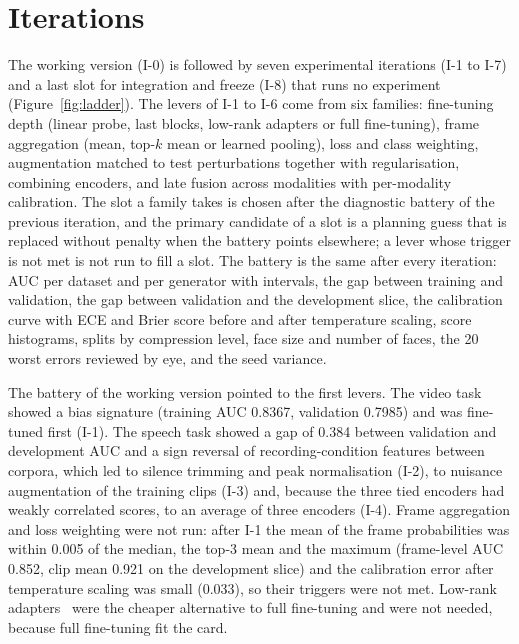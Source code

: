 \documentclass[conference,a4paper]{IEEEtran_nodash}
\begin{document}
\section{Iterations}\label{sec:iters}

The working version (I-0) is followed by seven experimental iterations (I-1 to
I-7) and a last slot for integration and freeze (I-8) that runs no experiment
(Figure~\ref{fig:ladder}). The levers of I-1 to I-6 come from six families:
fine-tuning depth (linear probe, last blocks, low-rank adapters or full
fine-tuning), frame aggregation (mean, top-$k$ mean or learned pooling), loss
and class weighting, augmentation matched to test perturbations together with
regularisation, combining encoders, and late fusion across modalities with
per-modality calibration. The slot a family takes is chosen after the
diagnostic battery of the previous iteration, and the primary candidate of a
slot is a planning guess that is replaced without penalty when the battery
points elsewhere; a lever whose trigger is not met is not run to fill a slot.
The battery is the same after every iteration: AUC per
dataset and per generator with intervals, the gap between training and
validation, the gap between validation and the development slice, the
calibration curve with ECE and Brier score before and after temperature
scaling, score histograms, splits by compression level, face size and number of
faces, the 20 worst errors reviewed by eye, and the seed variance.

The battery of the working version pointed to the first levers. The video task showed a bias signature (training AUC
0.8367, validation 0.7985) and was fine-tuned first (I-1). The speech task showed
a gap of 0.384 between validation and development AUC and a sign reversal of
recording-condition features between corpora, which led to silence trimming and
peak normalisation (I-2), to nuisance augmentation of the training clips (I-3)
and, because the three tied encoders had weakly correlated scores, to an average
of three encoders (I-4). Frame aggregation and loss weighting were not run:
after I-1 the mean of the frame probabilities was within 0.005 of the median,
the top-3 mean and the maximum (frame-level AUC 0.852, clip mean 0.921 on the
development slice)
and the calibration error after temperature scaling was small (0.033), so
their triggers were not met. Low-rank adapters~\cite{hu2022lora} were the
cheaper alternative to full fine-tuning and were not needed, because full
fine-tuning fit the card.
\end{document}
